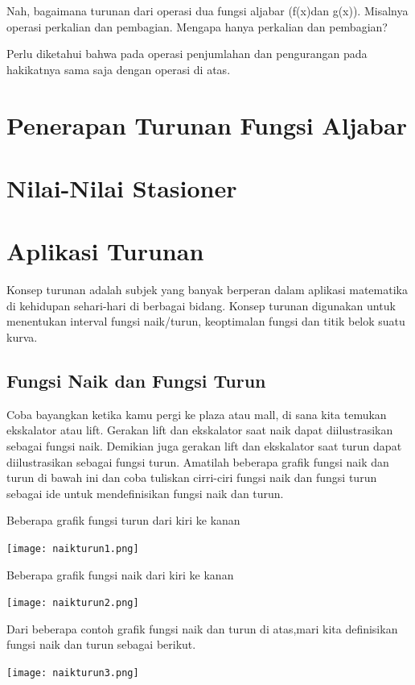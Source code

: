 \documentclass[11pt,fleqn]{book} %
\begin{document}
\noindent 
Nah, bagaimana turunan dari operasi dua fungsi aljabar (f(x)dan g(x)). Misalnya operasi perkalian dan pembagian. Mengapa hanya perkalian dan pembagian?

\noindent 
Perlu diketahui bahwa pada operasi penjumlahan dan pengurangan pada hakikatnya sama saja dengan operasi di atas.
 
 
 
\section{Penerapan Turunan Fungsi Aljabar}

\section{Nilai-Nilai Stasioner}

\section{Aplikasi Turunan}
Konsep turunan adalah subjek yang banyak berperan dalam aplikasi matematika di kehidupan sehari-hari di berbagai bidang. Konsep turunan digunakan untuk
menentukan interval fungsi naik/turun, keoptimalan fungsi dan titik belok suatu kurva.
\subsection{Fungsi Naik dan Fungsi Turun}
Coba bayangkan ketika kamu pergi ke plaza atau mall, di sana kita temukan ekskalator atau lift. Gerakan lift dan ekskalator saat naik dapat diilustrasikan sebagai fungsi naik. Demikian juga gerakan lift dan ekskalator saat turun dapat diilustrasikan sebagai fungsi turun. Amatilah beberapa grafik fungsi naik dan turun di bawah ini dan coba tuliskan cirri-ciri fungsi naik dan fungsi turun sebagai ide untuk mendefinisikan fungsi naik dan turun.

Beberapa grafik fungsi turun dari kiri ke kanan

\texttt{[image: naikturun1.png]}

Beberapa grafik fungsi naik dari kiri ke kanan

\texttt{[image: naikturun2.png]}

Dari beberapa contoh grafik fungsi naik dan turun di atas,mari kita definisikan fungsi naik dan turun sebagai berikut.

\texttt{[image: naikturun3.png]}
\end{document}
